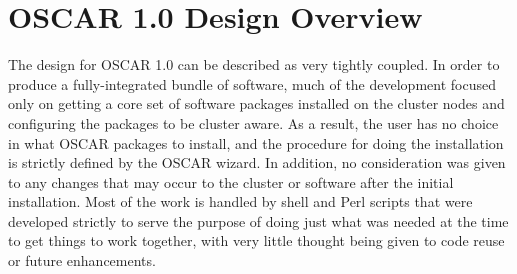 %
%
%

\section{OSCAR 1.0 Design Overview}

The design for OSCAR 1.0 can be described as very tightly coupled. In
order to produce a fully-integrated bundle of software, much of the
development focused only on getting a core set of software packages
installed on the cluster nodes and configuring the packages to be
cluster aware. As a result, the user has no choice in what OSCAR
packages to install, and the procedure for doing the installation is
strictly defined by the OSCAR wizard. In addition, no consideration
was given to any changes that may occur to the cluster or software
after the initial installation. Most of the work is handled by shell
and Perl scripts that were developed strictly to serve the purpose of
doing just what was needed at the time to get things to work together,
with very little thought being given to code reuse or future
enhancements.


